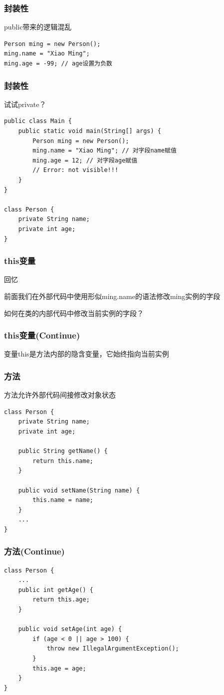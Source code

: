 \documentclass[UTF8, 16pt]{beamer}
\begin{document}
\begin{frame}[fragile]
    \frametitle{封装性}
    \textcolor{sufered}{public带来的逻辑混乱}
    \begin{lstlisting}
Person ming = new Person();
ming.name = "Xiao Ming";
ming.age = -99; // age设置为负数 
    \end{lstlisting}
\end{frame}

\begin{frame}[fragile]
    \frametitle{封装性}
    \textcolor{sufered}{试试private？}
    \begin{lstlisting}
public class Main {
    public static void main(String[] args) {
        Person ming = new Person();
        ming.name = "Xiao Ming"; // 对字段name赋值
        ming.age = 12; // 对字段age赋值
        // Error: not visible!!!
    }
}

class Person {
    private String name;
    private int age;
}
    \end{lstlisting}
\end{frame}

\begin{frame}
    \frametitle{this变量}
    \textcolor{sufered}{回忆}

    前面我们在外部代码中使用形似ming.name的语法修改ming实例的字段

    如何在类的内部代码中修改当前实例的字段？
\end{frame}

\begin{frame}
    \frametitle{this变量(Continue)}
    \textcolor{sufered}{变量this是方法内部的隐含变量，它始终指向当前实例}
\end{frame}

\begin{frame}[fragile]
    \frametitle{方法}
    \textcolor{sufered}{方法允许外部代码间接修改对象状态}
    \begin{lstlisting}
class Person {
    private String name;
    private int age;
        
    public String getName() {
        return this.name;
    }
        
    public void setName(String name) {
        this.name = name;
    }
    ...
}
    \end{lstlisting}
\end{frame}

\begin{frame}[fragile]
    \frametitle{方法(Continue)}
    \begin{lstlisting}
class Person {
    ...
    public int getAge() {
        return this.age;
    }
    
    public void setAge(int age) {
        if (age < 0 || age > 100) {
            throw new IllegalArgumentException();
        }
        this.age = age;
    }
}
    \end{lstlisting}
\end{frame}
\end{document}
